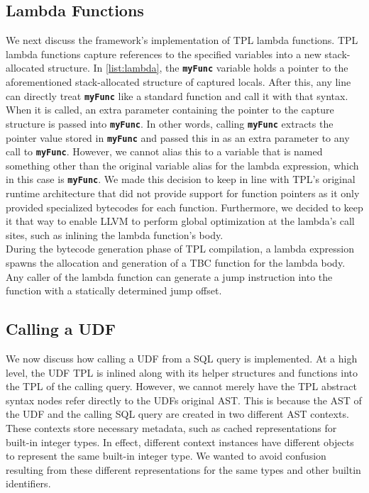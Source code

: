 \documentclass[12pt]{cmuthesis}
\newcommand{\dbSQL}[1]{\texttt{\textbf{#1}}\xspace}
\begin{document}
\subsection{Lambda Functions}
\label{sec:lambda}
We next discuss the framework's implementation of TPL lambda functions. TPL lambda functions capture references to the specified variables into a new stack-allocated structure. In \cref{list:lambda}, the \dbSQL{myFunc} variable holds a pointer to the aforementioned stack-allocated structure of captured locals. After this, any line can directly treat \dbSQL{myFunc} like a standard function and call it with that syntax. When it is called, an extra parameter containing the pointer to the capture structure is passed into \dbSQL{myFunc}. In other words, calling \dbSQL{myFunc} extracts the pointer value stored in \dbSQL{myFunc} and passed this in as an extra parameter to any call to \dbSQL{myFunc}. However, we cannot alias this to a variable that is named something other than the original variable alias for the lambda expression, which in this case is \dbSQL{myFunc}. We made this decision to keep in line with TPL’s original runtime architecture that did not provide support for function pointers as it only provided specialized bytecodes for each function. Furthermore, we decided to keep it that way to enable LLVM to perform global optimization at the lambda's call sites, such as inlining the lambda function’s body.\\

During the bytecode generation phase of TPL compilation, a lambda expression spawns the allocation and generation of a TBC function for the lambda body. Any caller of the lambda function can generate a jump instruction into the function with a statically determined jump offset.\\

\subsection{Calling a UDF}
    We now discuss how calling a UDF from a SQL query is implemented. At a high level, the UDF TPL is inlined along with its helper structures and functions into the TPL of the calling query. However, we cannot merely have the TPL abstract syntax nodes refer directly to the UDFs original AST. This is because the AST of the UDF and the calling SQL query are created in two different AST contexts. These contexts store necessary metadata, such as cached representations for built-in integer types. In effect, different context instances have different objects to represent the same built-in integer type. We wanted to avoid confusion resulting from these different representations for the same types and other builtin identifiers.\\
    
\end{document}
